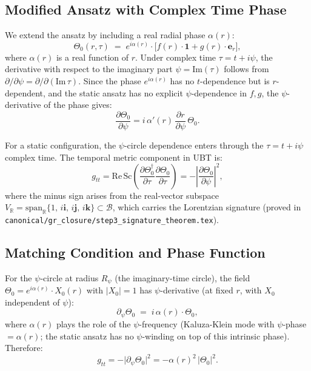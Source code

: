 \documentclass[11pt,a4paper]{article}
\theoremstyle{definition}
\theoremstyle{remark}
\begin{document}
\subsection{Modified Ansatz with Complex Time Phase}

We extend the ansatz by including a real radial phase $\alpha(r)$:
\begin{equation}
  \Theta_0(r,\tau)
  \;=\; e^{i\alpha(r)}\cdot\bigl[f(r)\cdot\mathbf{1} + g(r)\cdot\boldsymbol{e}_r\bigr],
  \label{eq:ansatz_complex_time}
\end{equation}
where $\alpha(r)$ is a real function of $r$.  Under complex time $\tau = t + i\psi$,
the derivative with respect to the imaginary part $\psi = \mathrm{Im}(\tau)$
follows from $\partial/\partial\psi = \partial/\partial(\mathrm{Im}\,\tau)$.
Since the phase $e^{i\alpha(r)}$ has no $t$-dependence but is $r$-dependent,
and the static ansatz has no explicit $\psi$-dependence in $f,g$, the
$\psi$-derivative of the phase gives:
\begin{equation}
  \frac{\partial\Theta_0}{\partial\psi}
  = i\,\alpha'(r)\,\frac{\partial r}{\partial\psi}\,\Theta_0.
  \label{eq:dTheta_psi}
\end{equation}

For a static configuration, the $\psi$-circle dependence enters through the
$\tau = t + i\psi$ complex time.  The temporal metric component in UBT is:
\begin{equation}
  g_{tt}
  = \mathrm{Re}\,\mathrm{Sc}\!\left(
      \frac{\partial\Theta_0^\dagger}{\partial\tau}
      \frac{\partial\Theta_0}{\partial\tau}
    \right)
  = -\left|\frac{\partial\Theta_0}{\partial\psi}\right|^2,
  \label{eq:g_tt_formula}
\end{equation}
where the minus sign arises from the real-vector subspace
$V_\mathbb{R} = \mathrm{span}_\mathbb{R}\{1,\,i\mathbf{i},\,i\mathbf{j},\,i\mathbf{k}\}
\subset \mathcal{B}$, which carries the Lorentzian signature
(proved in \texttt{canonical/gr\_closure/step3\_signature\_theorem.tex}).

\subsection{Matching Condition and Phase Function}

For the $\psi$-circle at radius $R_\psi$ (the imaginary-time circle),
the field $\Theta_0 = e^{i\alpha(r)}\cdot X_0(r)$ with $|X_0|=1$ has
$\psi$-derivative (at fixed $r$, with $X_0$ independent of $\psi$):
\begin{equation}
  \partial_\psi\Theta_0 \;=\; i\,\alpha(r)\cdot\Theta_0,
  \label{eq:psi_freq}
\end{equation}
where $\alpha(r)$ plays the role of the $\psi$-frequency (Kaluza-Klein
mode with $\psi$-phase $= \alpha(r)$; the static ansatz has no
$\psi$-winding on top of this intrinsic phase).  Therefore:
\begin{equation}
  g_{tt}
  = -\bigl|\partial_\psi\Theta_0\bigr|^2
  = -\alpha(r)^2\,|\Theta_0|^2.
  \label{eq:g_tt_alpha}
\end{equation}
\end{document}
